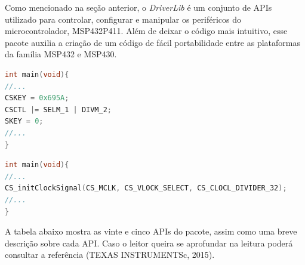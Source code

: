 Como mencionado na seção anterior, o \textit{DriverLib} é um conjunto de APIs utilizado para controlar, configurar e manipular os periféricos do microcontrolador, MSP432P411. Além de deixar o código mais intuitivo, esse pacote auxilia a criação de um código de fácil portabilidade entre as plataformas da família MSP432 e MSP430.


%
\renewcommand{\lstlistingname}{Código}
\begin{lstlisting}[caption={Configurando o MasterClock a nível de registrador},label={lst:codigo1},language=C]
int main(void){
//...
CSKEY = 0x695A;
CSCTL |= SELM_1 | DIVM_2;
SKEY = 0;
//...
}
\end{lstlisting}

\begin{lstlisting}[caption={Configurando o MasterClock com a API do DriverLib},label={lst:codigo2},language=C]
int main(void){
//...
CS_initClockSignal(CS_MCLK, CS_VLOCK_SELECT, CS_CLOCL_DIVIDER_32);
//...
}
\end{lstlisting}

A tabela abaixo mostra as vinte e cinco APIs do pacote, assim como  uma breve descrição sobre cada API. Caso o leitor queira se aprofundar na leitura poderá consultar a referência (TEXAS INSTRUMENTSc, 2015). 

